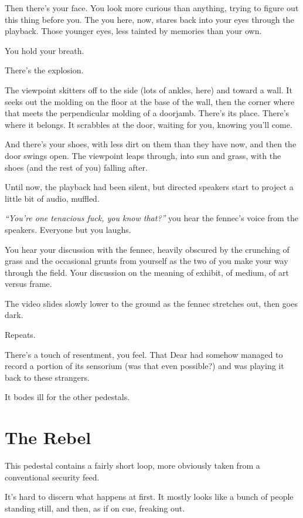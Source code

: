 Then there's your face. You look more curious than anything, trying to figure out this thing before you. The you here, now, stares back into your eyes through the playback. Those younger eyes, less tainted by memories than your own.

You hold your breath.

There's the explosion.

The viewpoint skitters off to the side (lots of ankles, here) and toward a wall. It seeks out the molding on the floor at the base of the wall, then the corner where that meets the perpendicular molding of a doorjamb. There's its place. There's where it belongs. It scrabbles at the door, waiting for you, knowing you'll come.

And there's your shoes, with less dirt on them than they have now, and then the door swings open. The viewpoint leaps through, into sun and grass, with the shoes (and the rest of you) falling after.

Until now, the playback had been silent, but directed speakers start to project a little bit of audio, muffled.

\emph{``You're one tenacious fuck, you know that?''} you hear the fennec's voice from the speakers. Everyone but you laughs.

You hear your discussion with the fennec, heavily obscured by the crunching of grass and the occasional grunts from yourself as the two of you make your way through the field. Your discussion on the meaning of exhibit, of medium, of art versus frame.

The video slides slowly lower to the ground as the fennec stretches out, then goes dark.

Repeats.

There's a touch of resentment, you feel. That Dear had somehow managed to record a portion of its sensorium (was that even possible?) and was playing it back to these strangers.

It bodes ill for the other pedestals.

\newpage
\section*{The Rebel}

This pedestal contains a fairly short loop, more obviously taken from a conventional security feed.

It's hard to discern what happens at first. It mostly looks like a bunch of people standing still, and then, as if on cue, freaking out.

